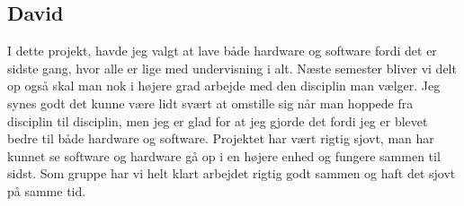 \subsection{David}

I dette projekt, havde jeg valgt at lave både hardware og software fordi det er sidste gang, hvor alle er lige med undervisning i alt. Næste semester bliver vi delt op også skal man nok i højere grad arbejde med den disciplin man vælger. Jeg synes godt det kunne være lidt svært at omstille sig når man hoppede fra disciplin til disciplin, men jeg er glad for at jeg gjorde det fordi jeg er blevet bedre til både hardware og software. Projektet har vært rigtig sjovt, man har kunnet se software og hardware gå op i en højere enhed og fungere sammen til sidst. Som gruppe har vi helt klart arbejdet rigtig godt sammen og haft det sjovt på samme tid.